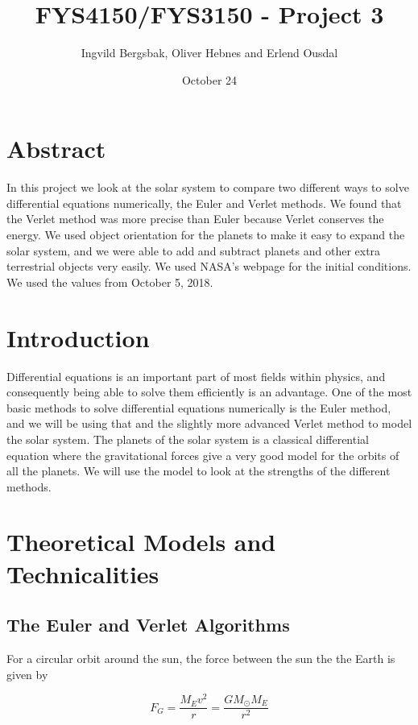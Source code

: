\documentclass{article}
\begin{document}
\title{\textbf{FYS4150/FYS3150 - Project 3}}
\author{Ingvild Bergsbak, Oliver Hebnes and Erlend Ousdal}
\date{October 24}




\maketitle

\section{Abstract}
In this project we look at the solar system to compare two different ways to solve differential equations numerically, the Euler and Verlet methods. We found that the Verlet method was more precise than Euler because Verlet conserves the energy. We used object orientation for the planets to make it easy to expand the solar system, and we were able to add and subtract planets and other extra terrestrial objects very easily. We used NASA's webpage \cite{NASA} for the initial conditions. We used the values from October 5, 2018.


\section{Introduction}
Differential equations is an important part of most fields within physics, and consequently being able to solve them efficiently is an advantage. One of the most basic methods to solve differential equations numerically is the Euler method, and we will be using that and the slightly more advanced Verlet method to model the solar system. The planets of the solar system is a classical differential equation where the gravitational forces give a very good model for the orbits of all the planets. We will use the model to look at the strengths of the different methods.


\section{Theoretical Models and Technicalities}

\subsection{The Euler and Verlet Algorithms}

For a circular orbit around the sun, the force between the sun the the Earth is given by

$$F_G=\frac{M_Ev^2}{r}=\frac{GM_{\odot}M_E}{r^2}$$
\end{document}
